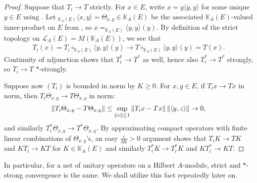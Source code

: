 \begin{proof}
	Suppose that $T_i \to T$ strictly. For $x \in E$, write $x = y\langle y,y\rangle$ for some unique $y \in E$ using . Let $_{\mathbb{K}_A(E)}\langle x,y \rangle = \Theta_{x,y} \in \mathbb{K}_A(E)$ be the associated $\mathbb{K}_A(E)$-valued inner-product on $E$ from , so $x = _{\mathbb{K}_A(E)} \langle y, y \rangle (y)$. By definition of the strict topology on $\mathcal{L}_A(E) = M(\mathbb{K}_A(E))$, we see that 
	\begin{align*}
		T_i(x) = T_i \circ _{\mathbb{K}_A(E)}\langle y,y\rangle (y) \to T \circ _{\mathbb{K}_A(E)} \langle y,y \rangle(y) = T(x).
	\end{align*}
	Continuity of adjunction shows that $T_i^* \to T^*$ as well, hence also $T_i^* \to T^*$ strongly, so $T_i \to T$ $*$-strongly.

	Suppose now $(T_i)$ is bounded in norm by $K \geq 0$. For $x, y \in E$, if $T_i x \to Tx$ in norm, then $T_i \Theta_{x,y} \to T \Theta_{x,y}$ in norm:
	\begin{align*}
		\left\lVert T_i \Theta_{x,y} - T \Theta_{x,y}\right\rVert  \leq \sup_{\left\lVert z \right\rVert \leq 1} \left\lVert T_i x - T x \right\rVert \left\lVert \langle y,z\rangle \right\rVert \to 0,
	\end{align*}
	and similarly $T_i^* \Theta_{x,y} \to T^* \Theta_{x,y}$. By approximating compact operators with finite linear combinations of $\Theta_{x,y}$'s, an easy $\frac{\varepsilon}{3K}>0$ argument shows that $T_i K \to T K$ and $KT_i \to KT$ for $K \in \mathbb{K}_A(E)$ and similarly $T_i^*K \to T_i^*K$ and $KT_i^* \to K T$.
\end{proof}

In particular, for a net of unitary operators on a Hilbert $A$-module, strict and $*$-strong convergence is the same. We shall utilize this fact repeatedly later on.
